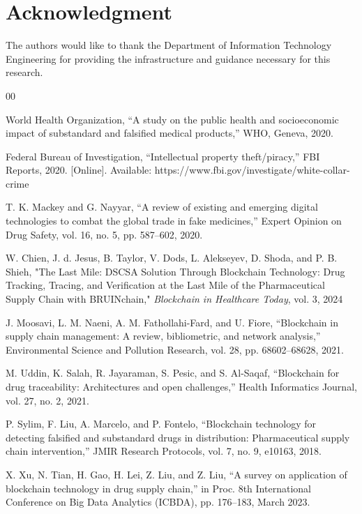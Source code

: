 \documentclass[conference]{IEEEtran}
\begin{document}
\section*{Acknowledgment}

The authors would like to thank the Department of Information Technology Engineering for providing the infrastructure and guidance necessary for this research.

\begin{thebibliography}{00}

 World Health Organization, ``A study on the public health and socioeconomic impact of substandard and falsified medical products,'' WHO, Geneva, 2020.

 Federal Bureau of Investigation, ``Intellectual property theft/piracy,'' FBI Reports, 2020. [Online]. Available: https://www.fbi.gov/investigate/white-collar-crime

 T. K. Mackey and G. Nayyar, ``A review of existing and emerging digital technologies to combat the global trade in fake medicines,'' Expert Opinion on Drug Safety, vol. 16, no. 5, pp. 587--602, 2020.

W. Chien, J. d. Jesus, B. Taylor, V. Dods, L. Alekseyev, D. Shoda, and P. B. Shieh, "The Last Mile: DSCSA Solution Through Blockchain Technology: Drug Tracking, Tracing, and Verification at the Last Mile of the Pharmaceutical Supply Chain with BRUINchain," \textit{Blockchain in Healthcare Today}, vol. 3, 2024

 J. Moosavi, L. M. Naeni, A. M. Fathollahi-Fard, and U. Fiore, ``Blockchain in supply chain management: A review, bibliometric, and network analysis,'' Environmental Science and Pollution Research, vol. 28, pp. 68602--68628, 2021.

 M. Uddin, K. Salah, R. Jayaraman, S. Pesic, and S. Al-Saqaf, ``Blockchain for drug traceability: Architectures and open challenges,'' Health Informatics Journal, vol. 27, no. 2, 2021.

 P. Sylim, F. Liu, A. Marcelo, and P. Fontelo, ``Blockchain technology for detecting falsified and substandard drugs in distribution: Pharmaceutical supply chain intervention,'' JMIR Research Protocols, vol. 7, no. 9, e10163, 2018.

 X. Xu, N. Tian, H. Gao, H. Lei, Z. Liu, and Z. Liu, ``A survey on application of blockchain technology in drug supply chain,'' in Proc. 8th International Conference on Big Data Analytics (ICBDA), pp. 176--183, March 2023.


\end{thebibliography}
\end{document}
